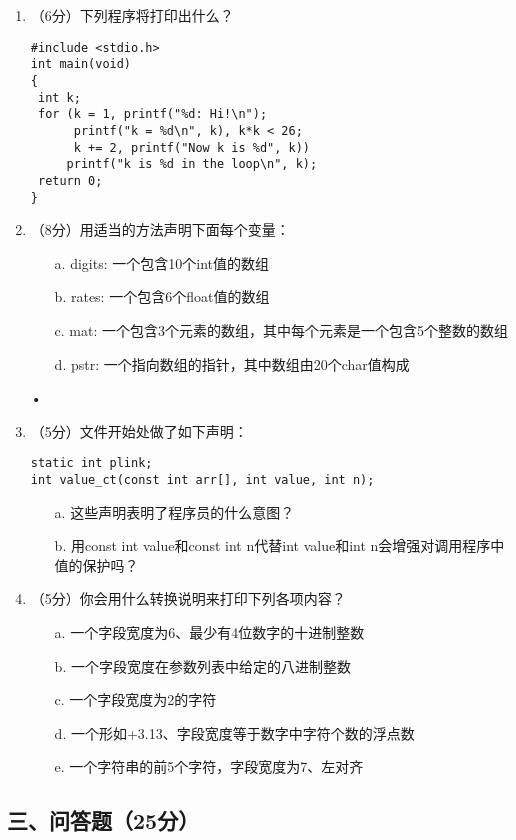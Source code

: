 \documentclass[8pt]{article}
\begin{document}
\begin{CJK}{UTF8}{gkai}
\begin{enumerate}
\item （6分）下列程序将打印出什么？
\begin{lstlisting}[showstringspaces=true]
#include <stdio.h>
int main(void)
{
 int k;
 for (k = 1, printf("%d: Hi!\n"); 
      printf("k = %d\n", k), k*k < 26;
      k += 2, printf("Now k is %d", k))
     printf("k is %d in the loop\n", k); 
 return 0;
}
\end{lstlisting}

\item （8分）用适当的方法声明下面每个变量：
\begin{itemize}
\item[a.] digits: 一个包含10个int值的数组
\item[b.] rates: 一个包含6个float值的数组
\item[c.] mat: 一个包含3个元素的数组，其中每个元素是一个包含5个整数的数组
\item[d.] pstr: 一个指向数组的指针，其中数组由20个char值构成
\end{itemize}•

\item （5分）文件开始处做了如下声明：
\begin{lstlisting} 
static int plink;
int value_ct(const int arr[], int value, int n);
\end{lstlisting}    
\begin{itemize}
\item[a.] 这些声明表明了程序员的什么意图？
\item[b.] 用const int value和const int n代替int value和int n会增强对调用程序中值的保护吗？
\end{itemize}

\item （5分）你会用什么转换说明来打印下列各项内容？
\begin{itemize}
\item[a.] 一个字段宽度为6、最少有4位数字的十进制整数
\item[b.] 一个字段宽度在参数列表中给定的八进制整数
\item[c.] 一个字段宽度为2的字符
\item[d.] 一个形如+3.13、字段宽度等于数字中字符个数的浮点数
\item[e.] 一个字符串的前5个字符，字段宽度为7、左对齐
\end{itemize}   
\end{enumerate}


\subsection*{三、问答题（25分）}


\end{CJK}
\end{document}
